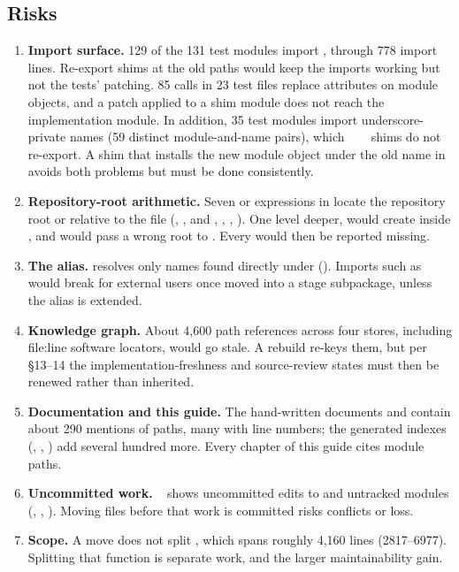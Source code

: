 \subsection{Risks}
\begin{enumerate}
  \item \textbf{Import surface.} 129 of the 131 test modules import , through 778 import lines. Re-export shims at the old paths would keep the imports working but not the tests' patching. 85  calls in 23 test files replace attributes on module objects, and a patch applied to a shim module does not reach the implementation module. In addition, 35 test modules import underscore-private names (59 distinct module-and-name pairs), which ~~~\code{*} shims do not re-export. A shim that installs the new module object under the old name in  avoids both problems but must be done consistently.
  \item \textbf{Repository-root arithmetic.} Seven  or  expressions in  locate the repository root or  relative to the file (, ,  and , , , ). One level deeper,  would create  inside , and  would pass a wrong root to . Every  would then be reported missing.
  \item \textbf{The  alias.}  resolves only names found directly under  (). Imports such as  would break for external users once  moved into a stage subpackage, unless the alias is extended.
  \item \textbf{Knowledge graph.} About 4,600 path references across four stores, including file:line software locators, would go stale. A rebuild re-keys them, but per  §13--14 the implementation-freshness and source-review states must then be renewed rather than inherited.
  \item \textbf{Documentation and this guide.} The hand-written documents and  contain about 290 mentions of  paths, many with line numbers; the generated indexes (, , ) add several hundred more. Every chapter of this guide cites module paths.
  \item \textbf{Uncommitted work.} ~ shows uncommitted edits to  and untracked modules (, , ). Moving files before that work is committed risks conflicts or loss.
  \item \textbf{Scope.} A move does not split , which spans roughly 4,160 lines (2817--6977). Splitting that function is separate work, and the larger maintainability gain.
\end{enumerate}

